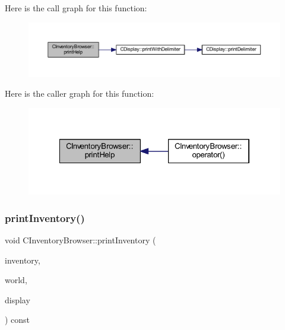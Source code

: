 Here is the call graph for this function\+:\nopagebreak
\begin{figure}[H]
\begin{center}
\leavevmode
\includegraphics[width=350pt]{class_c_inventory_browser_a96d9a928a1931b0df289b91baa3ae071_cgraph}
\end{center}
\end{figure}
Here is the caller graph for this function\+:\nopagebreak
\begin{figure}[H]
\begin{center}
\leavevmode
\includegraphics[width=322pt]{class_c_inventory_browser_a96d9a928a1931b0df289b91baa3ae071_icgraph}
\end{center}
\end{figure}
\mbox{\label{class_c_inventory_browser_a022cb6fc703bd156921816554c7a18b8}} 
\subsubsection{\texorpdfstring{print\+Inventory()}{printInventory()}}
{\footnotesize\ttfamily void C\+Inventory\+Browser\+::print\+Inventory (\begin{DoxyParamCaption}\item[{const \mbox{\hyperlink{class_c_inventory}{C\+Inventory}} \&}]{inventory,  }\item[{const \mbox{\hyperlink{class_c_world}{C\+World}} \&}]{world,  }\item[{const \mbox{\hyperlink{class_c_display}{C\+Display}} \&}]{display }\end{DoxyParamCaption}) const\hspace{0.3cm}{\ttfamily [protected]}}

